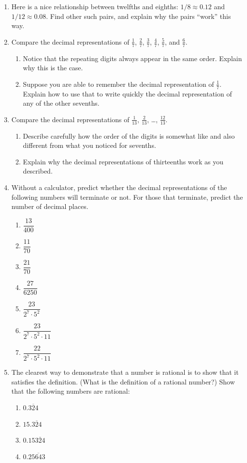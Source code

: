 \begin{problems}
\begin{enumerate}
\item Here is a nice relationship between twelfths and eighths:  $1/8\approx 0.12$ and $1/12\approx 0.08$.  Find other such pairs, and explain why the pairs ``work'' this way.   

\item Compare the decimal representations of $\frac{1}{7}$, $\frac{2}{7}$, $\frac{3}{7}$, $\frac{4}{7}$, $\frac{5}{7}$, and  $\frac{6}{7}$.
\begin{enumerate}  
\item Notice that the repeating digits always appear in the same order.  Explain why this is the case.
\item Suppose you are able to remember the decimal representation of $\frac{1}{7}$.  Explain how to use that to write quickly the decimal representation of any of the other sevenths.  
\end{enumerate}

\item 
Compare the decimal representations of $\frac{1}{13}$, $\frac{2}{13}$, \dots,  $\frac{12}{13}$.  
\begin{enumerate}  
\item Describe carefully how the order of the digits is somewhat like and also different from what you noticed for sevenths.  
\item Explain why the decimal representations of thirteenths work as you described.
\end{enumerate}

\item Without a calculator, predict whether the decimal representations of the following numbers will terminate or not.  For those that terminate, predict the number of decimal places.  
\begin{enumerate}
\item $\dfrac{13}{400}$
\item $\dfrac{11}{70}$
\item $\dfrac{21}{70}$
\item $\dfrac{27}{6250}$
\item $\dfrac{23}{2^7\cdot 5^2}$
\item $\dfrac{23}{2^7\cdot 5^2\cdot 11}$
\item $\dfrac{22}{2^7\cdot 5^2\cdot 11}$
\end{enumerate}

\item The clearest way to demonstrate that a number is rational is to show that it satisfies the definition.  (What is the definition of a rational number?)  Show that the following numbers are rational:  
\begin{enumerate}
\item $0.\overline{324}$
\item $15.\overline{324}$
\item $0.15\overline{324}$
\item $0.2\overline{5643}$
\end{enumerate}



\end{enumerate}
\end{problems}
